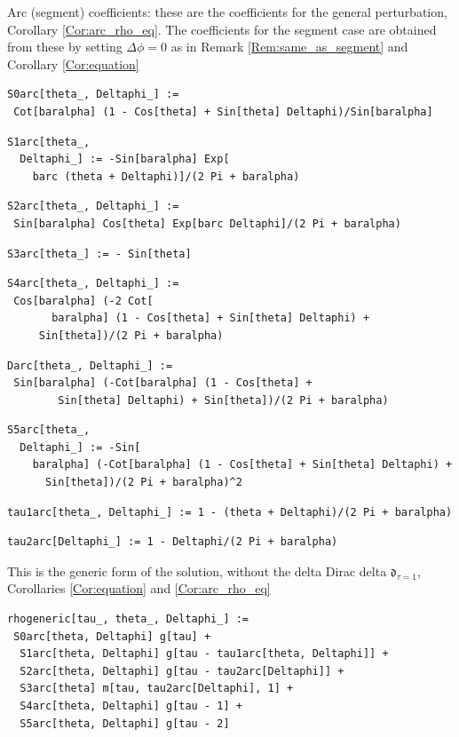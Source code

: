 \documentclass[reqno]{amsart}
\theoremstyle{definition} \newtheorem{definition}{Definition}[section]
\theoremstyle{definition} \newtheorem{remark}[definition]{Remark}
\theoremstyle{plain} \newtheorem{lemma}[definition]{Lemma}
\theoremstyle{plain} \newtheorem{proposition}[definition]{Proposition}
\theoremstyle{plain} \newtheorem{theorem}[definition]{Theorem}
\theoremstyle{plain} \newtheorem{corollary}[definition]{Corollary}
\theoremstyle{definition} \newtheorem{example}[definition]{Example}
\theoremstyle{plain} \newtheorem{claim}[clai]{Claim}
\theoremstyle{definition} \newtheorem{assumption}[definition]{Assumption}
\theoremstyle{definition} \newtheorem{observation}[definition]{Observation}
\newcommand{\1}{\mathbbm 1}
\newcommand{\Diracd}{\mathfrak{d}}
\newcommand{\smed}{\medskip}
\numberwithin{equation}{section} %
\theoremstyle{plain} \newtheorem*{theorem*}{Theorem}
\theoremstyle{plain} \newtheorem{mthm}[maintheorem]{Main Theorem}
\theoremstyle{plain} \newtheorem*{mthm*}{Main Theorem}
\theoremstyle{plain} \newtheorem*{conjecture*}{Conjecture}
\theoremstyle{plain} \newtheorem{conjecture}[definition]{Conjecture}
\theoremstyle{plain} \newtheorem*{problem*}{Problem}
\begin{document}
\noindent Arc (segment) coefficients: these are the coefficients for the general perturbation, Corollary \ref{Cor:arc_rho_eq}. The coefficients for the segment case are obtained from these by setting $\Delta \phi = 0$ as in Remark \ref{Rem:same_as_segment} and Corollary \ref{Cor:equation}
\smed
\begin{verbatim}
S0arc[theta_, Deltaphi_] := 
 Cot[baralpha] (1 - Cos[theta] + Sin[theta] Deltaphi)/Sin[baralpha]
\end{verbatim}
\begin{verbatim}
S1arc[theta_, 
  Deltaphi_] := -Sin[baralpha] Exp[
    barc (theta + Deltaphi)]/(2 Pi + baralpha)
\end{verbatim}
\begin{verbatim}
S2arc[theta_, Deltaphi_] := 
 Sin[baralpha] Cos[theta] Exp[barc Deltaphi]/(2 Pi + baralpha)
\end{verbatim}
\begin{verbatim}
S3arc[theta_] := - Sin[theta]
\end{verbatim}
\begin{verbatim}
S4arc[theta_, Deltaphi_] := 
 Cos[baralpha] (-2 Cot[
       baralpha] (1 - Cos[theta] + Sin[theta] Deltaphi) + 
     Sin[theta])/(2 Pi + baralpha)
\end{verbatim}
\begin{verbatim}
Darc[theta_, Deltaphi_] := 
 Sin[baralpha] (-Cot[baralpha] (1 - Cos[theta] + 
        Sin[theta] Deltaphi) + Sin[theta])/(2 Pi + baralpha)
\end{verbatim}
\begin{verbatim}
S5arc[theta_, 
  Deltaphi_] := -Sin[
    baralpha] (-Cot[baralpha] (1 - Cos[theta] + Sin[theta] Deltaphi) +
      Sin[theta])/(2 Pi + baralpha)^2
\end{verbatim}
\begin{verbatim}
tau1arc[theta_, Deltaphi_] := 1 - (theta + Deltaphi)/(2 Pi + baralpha)
\end{verbatim}
\begin{verbatim}
tau2arc[Deltaphi_] := 1 - Deltaphi/(2 Pi + baralpha)
\end{verbatim}
\medskip
This is the generic form of the solution, without the delta Dirac delta $\Diracd_{\tau=1}$, Corollaries \ref{Cor:equation} and \ref{Cor:arc_rho_eq}
\medskip
\begin{verbatim}
rhogeneric[tau_, theta_, Deltaphi_] := 
 S0arc[theta, Deltaphi] g[tau] + 
  S1arc[theta, Deltaphi] g[tau - tau1arc[theta, Deltaphi]] + 
  S2arc[theta, Deltaphi] g[tau - tau2arc[Deltaphi]] + 
  S3arc[theta] m[tau, tau2arc[Deltaphi], 1] + 
  S4arc[theta, Deltaphi] g[tau - 1] + 
  S5arc[theta, Deltaphi] g[tau - 2]
\end{verbatim}
\end{document}
